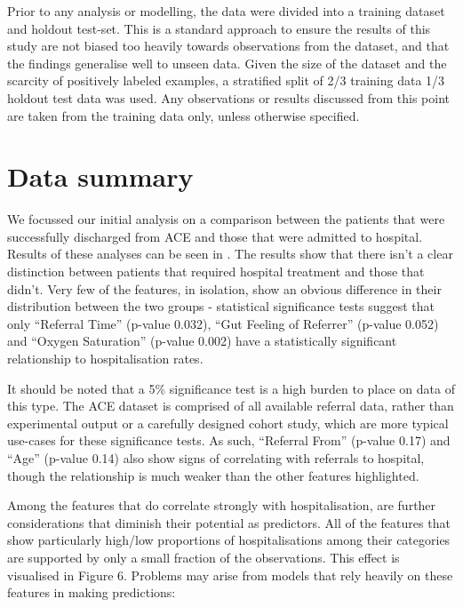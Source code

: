 Prior to any analysis or modelling, the data were divided into a training dataset and holdout test-set.
This is a standard approach to ensure the results of this study are not biased too heavily towards observations from the dataset, and that the findings generalise well to unseen data.
Given the size of the dataset and the scarcity of positively labeled examples, a stratified split of 2/3 training data 1/3 holdout test data was used.
Any observations or results discussed from this point are taken from the training data only, unless otherwise specified.


\section{Data summary}\label{sec:data-summary}

We focussed our initial analysis on a comparison between the patients that were successfully discharged from ACE and those that were admitted to hospital. Results of these analyses can be seen in . The results show that there isn't a clear distinction between patients that required hospital treatment and those that didn't. Very few of the features, in isolation, show an obvious difference in their distribution between the two groups - statistical significance tests suggest that only ``Referral Time'' (p-value 0.032), ``Gut Feeling of Referrer'' (p-value 0.052) and ``Oxygen Saturation'' (p-value 0.002) have a statistically significant relationship to hospitalisation rates.

It should be noted that a 5\% significance test is a high burden to place on data of this type. The ACE dataset is comprised of all available referral data, rather than experimental output or a carefully designed cohort study, which are more typical use-cases for these significance tests. As such, ``Referral From'' (p-value 0.17) and ``Age'' (p-value 0.14) also show signs of correlating with referrals to hospital, though the relationship is much weaker than the other features highlighted.

Among the features that do correlate strongly with hospitalisation, are further considerations that diminish their potential as predictors. All of the features that show particularly high/low proportions of hospitalisations among their categories are supported by only a small fraction of the observations. This effect is visualised in Figure 6. Problems may arise from models that rely heavily on these features in making predictions:

